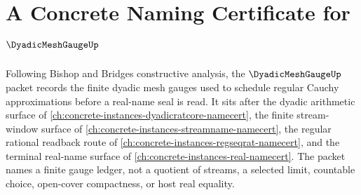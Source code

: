 \chapter{A Concrete Naming Certificate for $\DyadicMeshGaugeUp$}
\label{ch:concrete-instances-dyadic-mesh-gauge-namecert}

Following Bishop and Bridges constructive analysis, the $\DyadicMeshGaugeUp$ packet records the finite dyadic mesh gauges used to schedule regular Cauchy approximations before a real-name seal is read. It sits after the dyadic arithmetic surface of \autoref{ch:concrete-instances-dyadicratcore-namecert}, the finite stream-window surface of \autoref{ch:concrete-instances-streamname-namecert}, the regular rational readback route of \autoref{ch:concrete-instances-regseqrat-namecert}, and the terminal real-name surface of \autoref{ch:concrete-instances-real-namecert}. The packet names a finite gauge ledger, not a quotient of streams, a selected limit, countable choice, open-cover compactness, or host real equality.


